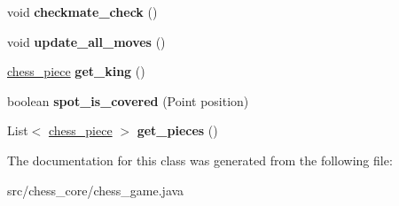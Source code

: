 \begin{DoxyCompactItemize}
\item 
\hypertarget{classchess__core_1_1chess__game_1_1player_af05cb913814162b672d107e40bb2bc45}{}void {\bfseries checkmate\+\_\+check} ()\label{classchess__core_1_1chess__game_1_1player_af05cb913814162b672d107e40bb2bc45}

\item 
\hypertarget{classchess__core_1_1chess__game_1_1player_a703c3b61a03ad5bd3301ffe100f3dd90}{}void {\bfseries update\+\_\+all\+\_\+moves} ()\label{classchess__core_1_1chess__game_1_1player_a703c3b61a03ad5bd3301ffe100f3dd90}

\item 
\hypertarget{classchess__core_1_1chess__game_1_1player_a9339ace043de1a8e0b99817ed9bf2bc1}{}\hyperlink{classchess__core_1_1chess__piece}{chess\+\_\+piece} {\bfseries get\+\_\+king} ()\label{classchess__core_1_1chess__game_1_1player_a9339ace043de1a8e0b99817ed9bf2bc1}

\item 
\hypertarget{classchess__core_1_1chess__game_1_1player_a53968bd363049db699f352b1c02bdc1d}{}boolean {\bfseries spot\+\_\+is\+\_\+covered} (Point position)\label{classchess__core_1_1chess__game_1_1player_a53968bd363049db699f352b1c02bdc1d}

\item 
\hypertarget{classchess__core_1_1chess__game_1_1player_a68aeb81dc6b94c95dff92c75facba1ba}{}List$<$ \hyperlink{classchess__core_1_1chess__piece}{chess\+\_\+piece} $>$ {\bfseries get\+\_\+pieces} ()\label{classchess__core_1_1chess__game_1_1player_a68aeb81dc6b94c95dff92c75facba1ba}

\end{DoxyCompactItemize}


The documentation for this class was generated from the following file\+:\begin{DoxyCompactItemize}
\item 
src/chess\+\_\+core/chess\+\_\+game.\+java\end{DoxyCompactItemize}
